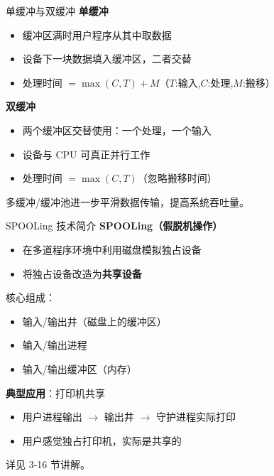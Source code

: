 \documentclass[10pt, aspectratio=169]{beamer}
\begin{document}
\begin{frame}{单缓冲与双缓冲}
    \textbf{单缓冲}
    \begin{itemize}
        \item 缓冲区满时用户程序从其中取数据
        \item 设备下一块数据填入缓冲区，二者交替
        \item 处理时间 $= \max(C, T) + M$（$T$:输入,$C$:处理,$M$:搬移）
    \end{itemize}
    \vspace{0.5em}
    \textbf{双缓冲}
    \begin{itemize}
        \item 两个缓冲区交替使用：一个处理，一个输入
        \item 设备与 CPU 可真正并行工作
        \item 处理时间 $= \max(C, T)$（忽略搬移时间）
    \end{itemize}
    \vspace{0.5em}
    多缓冲/缓冲池进一步平滑数据传输，提高系统吞吐量。
\end{frame}

\begin{frame}{SPOOLing 技术简介}
    \textbf{SPOOLing（假脱机操作）}
    \begin{itemize}
        \item 在多道程序环境中利用磁盘模拟独占设备
        \item 将独占设备改造为\textbf{共享设备}
    \end{itemize}
    \vspace{0.5em}
    核心组成：
    \begin{itemize}
        \item 输入/输出井（磁盘上的缓冲区）
        \item 输入/输出进程
        \item 输入/输出缓冲区（内存）
    \end{itemize}
    \vspace{0.5em}
    \textbf{典型应用}：打印机共享
    \begin{itemize}
        \item 用户进程输出 $\rightarrow$ 输出井 $\rightarrow$ 守护进程实际打印
        \item 用户感觉独占打印机，实际是共享的
    \end{itemize}
    \vspace{0.5em}
    详见 3-16 节讲解。
\end{frame}
\end{document}
